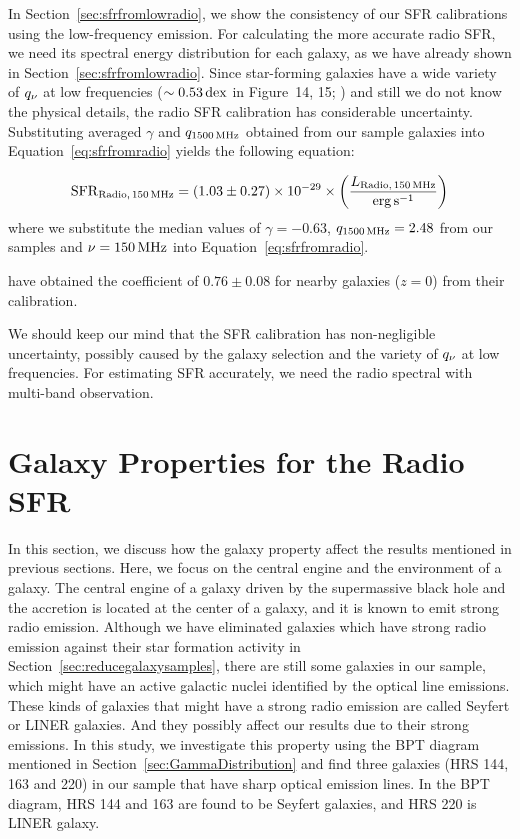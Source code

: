 In Section~\ref{sec:sfrfromlowradio}, we show the consistency of our SFR calibrations using the low-frequency emission.
For calculating the more accurate radio SFR, we need its spectral energy distribution for each galaxy, as we have already shown in Section~\ref{sec:sfrfromlowradio}.
Since star-forming galaxies have a wide variety of $q_{\nu}$ at low frequencies ($\sim 0.53\,\mathrm{dex}$ in Figure~14, 15; \citealt{CalistroRivera2017a}) and still we do not know the physical details, the radio SFR calibration has considerable uncertainty.
Substituting averaged $\gamma$ and $q_{\mathrm{1500\,\mathrm{MHz}}}$ obtained from our sample galaxies into Equation~\ref{eq:sfrfromradio} yields the following equation:

\begin{equation}\label{eq:sfrradio_calibration}
    \mathrm{SFR}_{\mathrm{Radio},\,150\,\mathrm{MHz}} = \left(1.03\pm0.27\right) \times 10^{-29} \times \left(\frac{L_{\mathrm{Radio},\,150\,\mathrm{MHz}}}{\mathrm{erg}\,\mathrm{s}^{-1}}\right)
\end{equation}
where we substitute the median values of $\gamma=-0.63$, $q_{\mathrm{1500\,\mathrm{MHz}}}=2.48$ from our samples and $\nu=150\,\mathrm{MHz}$ into Equation~\ref{eq:sfrfromradio}.

\citet{CalistroRivera2017a} have obtained the coefficient of $0.76 \pm 0.08$ for nearby galaxies ($z = 0$) from their calibration.

We should keep our mind that the SFR calibration has non-negligible uncertainty, possibly caused by the galaxy selection and the variety of $q_{\nu}$ at low frequencies.
For estimating SFR accurately, we need the radio spectral with multi-band observation.



\section{Galaxy Properties for the Radio SFR}\label{sec:galaxypropertiesfortheradiosfr}

In this section, we discuss how the galaxy property affect the results mentioned in previous sections.
Here, we focus on the central engine and the environment of a galaxy.
The central engine of a galaxy driven by the supermassive black hole and the accretion is located at the center of a galaxy, and it is known to emit strong radio emission.
Although we have eliminated galaxies which have strong radio emission against their star formation activity in Section~\ref{sec:reducegalaxysamples}, there are still some galaxies in our sample, which might have an active galactic nuclei identified by the optical line emissions.
These kinds of galaxies that might have a strong radio emission are called Seyfert or LINER galaxies.
And they possibly affect our results due to their strong emissions.
In this study, we investigate this property using the BPT diagram mentioned in Section~\ref{sec:GammaDistribution} and find three galaxies (HRS 144, 163 and 220) in our sample that have sharp optical emission lines.
In the BPT diagram, HRS 144 and 163 are found to be Seyfert galaxies, and HRS 220 is LINER galaxy.

